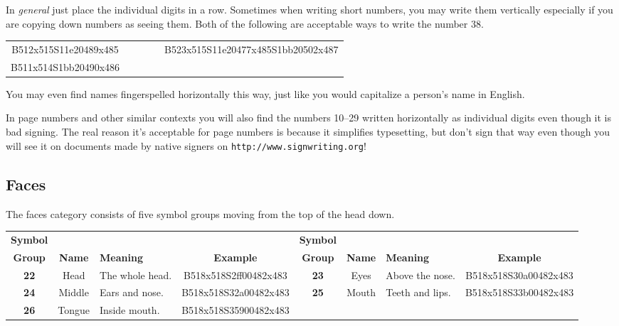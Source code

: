 \documentclass{article}
\begin{document}
In \emph{general} just place the individual digits in a row.
Sometimes when writing short numbers, you may write them vertically especially if you are copying down numbers as seeing them.
Both of the following are acceptable ways to write the number 38.

\begin{center}
\begin{tabular}{*{3}{c}}
B512x515S11e20489x485&\ \ \ \ \ &B523x515S11e20477x485S1bb20502x487\\
B511x514S1bb20490x486\\
\end{tabular}
\end{center}

You may even find names fingerspelled horizontally this way, just like you would capitalize a person's name in English.

In page numbers and other similar contexts you will also find the numbers 10--29 written horizontally as individual digits even though it is bad signing.
The real reason it's acceptable for page numbers is because it simplifies typesetting, but don't sign that way even though you will see it on documents made by native signers on \texttt{http://www.signwriting.org}!

\subsection{Faces}

The faces category consists of five symbol groups moving from the top of the head down.

\begin{center}
\begin{tabular}{ccp{21mm}c@{\hskip 5mm}ccp{21mm}c}
\textbf{Symbol}&&&&\textbf{Symbol}\\
\textbf{Group}&\textbf{Name}&\textbf{Meaning}&\textbf{Example}&\textbf{Group}&\textbf{Name}&\textbf{Meaning}&\textbf{Example}\\
\textbf{22}&Head  &The whole head.&B518x518S2ff00482x483&\textbf{23}&Eyes &Above the nose.&B518x518S30a00482x483\\
\textbf{24}&Middle&Ears and nose. &B518x518S32a00482x483&\textbf{25}&Mouth&Teeth and lips.&B518x518S33b00482x483\\
\textbf{26}&Tongue&Inside mouth.  &B518x518S35900482x483\\
\end{tabular}
\end{center}
\end{document}
